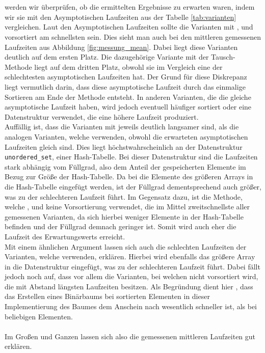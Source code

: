 \section{}
 werden wir überprüfen, ob die ermittelten Ergebnisse zu erwarten waren, indem wir sie 
mit den Asymptotischen Laufzeiten aus der Tabelle \ref{tab:varianten} vergleichen.
Laut den Asymptotischen Laufzeiten sollte die Varianten mit \SorSor{}, \distr{} und vorsortiert am schnellsten
sein. Dies sieht man auch bei den mittleren gemessenen Laufzeiten aus Abbildung \ref{fig:messung_mean}.
Dabei liegt diese Varianten deutlich auf dem ersten Platz. Die dazugehörige Variante mit
der Tausch-Methode \perm{} liegt auf dem dritten Platz, obwohl sie im Vergleich eine der
schlechtesten asymptotischen Laufzeiten hat. Der Grund für diese Diskrepanz 
liegt vermutlich darin, dass diese
asymptotische Laufzeit durch das einmalige Sortieren am Ende der Methode entsteht. 
In anderen Varianten, die die gleiche asymptotische Laufzeit haben, wird jedoch eventuell häufiger
sortiert oder eine Datenstruktur verwendet, die eine höhere Laufzeit produziert.
\\
Auffällig ist, dass die Varianten mit \USetSea{} jeweils deutlich langsamer sind, als die analogen
Varianten, welche \SeaUSet{} verwenden, obwohl die erwarteten asymptotischen Laufzeiten
gleich sind. Dies liegt höchstwahrscheinlich an der
Datenstruktur \texttt{unordered\_set}, einer Hash-Tabelle. Bei dieser Datenstruktur
sind die Laufzeiten stark abhängig vom Füllgrad, also dem Anteil der 
gespeicherten Elemente im Bezug zur Größe der Hash-Tabelle. Da bei \USetSea{} die Elemente
des größeren Arrays in die Hash-Tabelle eingefügt werden, ist der Füllgrad dementsprechend
auch größer, was zu der schlechteren Laufzeit führt.
Im Gegensatz dazu, ist die Methode, welche \SeaUSet, \perm{} und keine Vorsortierung verwendet,
die im Mittel zweitschnellste aller gemessenen Varianten, da sich hierbei
weniger Elemente in der Hash-Tabelle befinden und der Füllgrad demnach geringer ist. 
Somit wird auch eher die Laufzeit des Erwartungswerts erreicht.
\\
Mit einem ähnlichen Argument lassen sich auch die schlechten Laufzeiten 
der Varianten, welche \SetSea{} verwenden, erklären. Hierbei wird ebenfalls das größere
Array in die Datenstruktur eingefügt, was zu der schlechteren Laufzeit führt.  
Dabei fällt jedoch noch auf, dass vor allem die Varianten, 
bei welchen nicht vorsortiert wird, die mit Abstand längsten Laufzeiten besitzen. Als Begründung 
dient hier , dass das Erstellen eines Binärbaums bei sortierten Elementen in dieser
Implementierung des Baumes dem Anschein nach wesentlich schneller ist, als bei beliebigen Elementen.
\\
\\
Im Großen und Ganzen lassen sich also die gemessenen mittleren Laufzeiten gut erklären.



